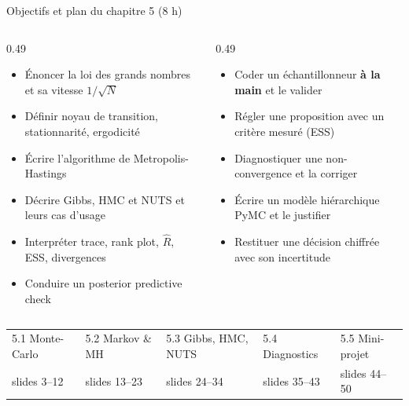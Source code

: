 \begin{frame}{Objectifs et plan du chapitre 5 (8 h)}
\begin{columns}[t]
\begin{column}{0.49\textwidth}
\begin{kbox}[Savoirs]
\begin{itemize}
  \item Énoncer la loi des grands nombres et sa vitesse $1/\sqrt{N}$
  \item Définir noyau de transition, stationnarité, ergodicité
  \item Écrire l'algorithme de Metropolis-Hastings
  \item Décrire Gibbs, HMC et NUTS et leurs cas d'usage
  \item Interpréter trace, rank plot, $\hat R$, ESS, divergences
  \item Conduire un posterior predictive check
\end{itemize}
\end{kbox}
\end{column}
\begin{column}{0.49\textwidth}
\begin{abox}
\begin{itemize}
  \item Coder un échantillonneur \textbf{à la main} et le valider
  \item Régler une proposition avec un critère mesuré (ESS)
  \item Diagnostiquer une non-convergence et la corriger
  \item Écrire un modèle hiérarchique PyMC et le justifier
  \item Restituer une décision chiffrée avec son incertitude
\end{itemize}
\end{abox}
\end{column}
\end{columns}
\vspace{2mm}
\centering\footnotesize
\begin{tabular}{@{}lllll@{}}
\toprule
5.1 Monte-Carlo & 5.2 Markov \& MH & 5.3 Gibbs, HMC, NUTS & 5.4 Diagnostics & 5.5 Mini-projet \\
slides 3--12 & slides 13--23 & slides 24--34 & slides 35--43 & slides 44--50 \\
\bottomrule
\end{tabular}
\end{frame}

